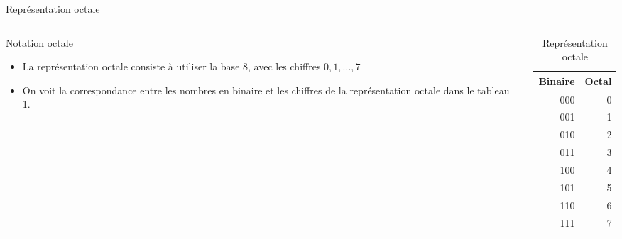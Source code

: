 \documentclass[presentation]{beamer}
\begin{document}
\begin{frame}[label={sec:orgbe682ce}]{Représentation octale}
\begin{columns}
\begin{column}{0.48\columnwidth}
\begin{block}{Notation octale}
\begin{itemize}
\item La représentation octale consiste à utiliser la base 8, avec les chiffres \(0, 1, \ldots, 7\)

\item On voit la correspondance entre les nombres en binaire et les chiffres de la représentation octale dans le tableau \ref{tab:org48de0a9}.
\end{itemize}
\end{block}
\end{column}

\begin{column}{0.48\columnwidth}
\begin{block}{}
\begin{table}[htbp]
\caption{\label{tab:org48de0a9}Représentation octale}
\centering
\begin{tabular}{rr}
Binaire & Octal\\[0pt]
\hline
000 & 0\\[0pt]
001 & 1\\[0pt]
010 & 2\\[0pt]
011 & 3\\[0pt]
100 & 4\\[0pt]
101 & 5\\[0pt]
110 & 6\\[0pt]
111 & 7\\[0pt]
\end{tabular}
\end{table}
\end{block}
\end{column}
\end{columns}
\end{frame}
\end{document}
